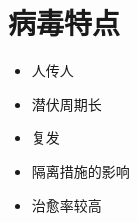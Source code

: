 \section{病毒特点}
\begin{itemize}
    \item 人传人
    \item 潜伏周期长
    \item 复发
    \item 隔离措施的影响
    \item 治愈率较高
\end{itemize}

